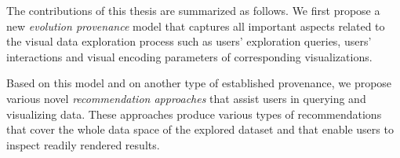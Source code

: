 %
%
%
%
%
%
%
%

The contributions of this thesis are summarized as follows. We first propose a new \emph{evolution provenance} model that captures all important aspects related to the visual data exploration process such as users' exploration queries, users' interactions and visual encoding parameters of corresponding visualizations.

Based on this model and on another type of established provenance, we propose various novel \emph{recommendation approaches} that assist users in querying and visualizing data.
These approaches produce various types of recommendations that cover the whole data space of the explored dataset and that enable users to inspect readily rendered results.


